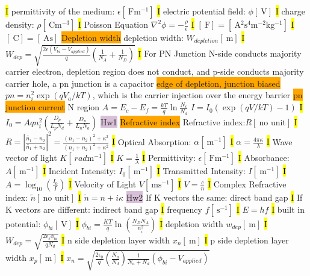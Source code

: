 \documentclass[fontsize=3]{scrartcl}
\begin{document}
\hl{I}
permittivity of the medium: $ \epsilon [\SI{}{\farad \meter^{-1}}]  $
\hl{I}
electric potential field: $ \phi [\SI{}{\volt}]  $
\hl{I}
charge density: $ \rho [\SI{}{\coulomb \meter^{-3}}]  $
\hl{I}
Poisson Equation $\nabla^2 \phi = -\frac{\rho}{\epsilon}$
\hl{I}
$[\SI{}{\farad}] = [\SI{}{\ampere^2 \second^4 \meter^{-2} \kilogram^{-1}}] $
\hl{I}
$[\SI{}{\coulomb}] = [\SI{}{\ampere \second}] $
\colorbox{Orange}{Depletion width}
depletion width: $W_{depletion} [\SI{}{\meter}]  $
\hl{I}
$W_{dep} = \sqrt{\frac{2 \epsilon ( V_{bi} - V_{applied} ) } {q} (\frac{1}{N_A} + \frac{1}{N_D})}$
\hl{I}
For PN Junction N-side conducts majority carrier electron, depletion region does not conduct, and p-side conducts majority carrier hole, a pn junction is a capacitor
\colorbox{Orange}{edge of depletion, junction biased}
$pn = n_i^2 \exp(qV_a / kT)$, which is the carrier injection over the energy barrier
\colorbox{Orange}{pn junction current}
N region $A = E_c - E_f = \frac{kT}{q}\ln \frac{N_c}{N_d}$
$I = I_0 (\exp(qV/kT) - 1)$
\hl{I}
$I_0 = A qn_i^2(\frac{D_p}{L_p N_d} + \frac{D_n}{L_n N_a})$
\colorbox{Thistle}{Hw1}
\colorbox{Orange}{Refractive index}
Refractive index:$R [\SI{}{\text{no unit}}]$
\hl{I} 
$ R = | \frac{ \widetilde{n_1} - n_2} {\widetilde{n_1} + n_2} |^2 = \frac{ (n_1 - n_2)^2 + \kappa^2 } {(n_1 + n_2)^2 + \kappa^2 }  $
\hl{I}
Optical Absorption: $\alpha [\SI{}{\meter^{-1}}]$
\hl{I}
$\alpha = \frac{4\pi \kappa}{\lambda}$
\hl{I}
Wave vector of light $K [\SI{}{rad \meter^{-1}}]  $
\hl{I}
$K = \frac{1}{\lambda}$
\hl{I}
Permittivity: $\epsilon [\SI{}{\farad \meter^{-1}}]$
\hl{I}
Absorbance: $A [\SI{}{\meter^{-1}}]$
\hl{I}
Incident Intensity: $I_0 [\SI{}{\meter^{-1}}]$
\hl{I}
Transmitted Intensity: $I [\SI{}{\meter^{-1}}]$
\hl{I}
$A = \log_{10}(\frac{I_0}{I})$
\hl{I}
Velocity of Light $V  [\SI{}{\meter \second^{-1} }]$
\hl{I}
$V = \frac{c}{n}$
\hl{I}
Complex Refractive index: $\widetilde{n} [\SI{}{\text{no unit}}]$
\hl{I}
$\widetilde{n} = n + i \kappa$
\colorbox{Thistle}{Hw2}
If K vectors the same: direct band  gap
\hl{I}
If K vectors are different: indirect band gap
\hl{I}
frequency $f  [\SI{}{ \second^{-1} }]$
\hl{I}
$E = h f$
\hl{I}
built in potential: $\phi_{bi}  [\SI{}{ \volt }]$
\hl{I}
$\phi_{bi} = \frac{KT}{q}\ln (\frac{N_D N_A}{n_i^2})$
\hl{I}
depletion width $w_{dep}  [\SI{}{ \meter}]$
\hl{I}
$W_{dep} = \sqrt{\frac{2 \epsilon_s \phi_{bi}}{qN_d}}$
\hl{I}
n side depletion layer width $x_n  [\SI{}{ \meter}]$
\hl{I}
p side depletion layer width $x_p  [\SI{}{ \meter}]$
\hl{I}
$x_n = \sqrt{ \frac{2 \epsilon_0}{q}(\frac{N_a}{N_d}) \frac{1}{N_a + N_d}(\phi_{bi} - V_{applied}) }$
\end{document}
